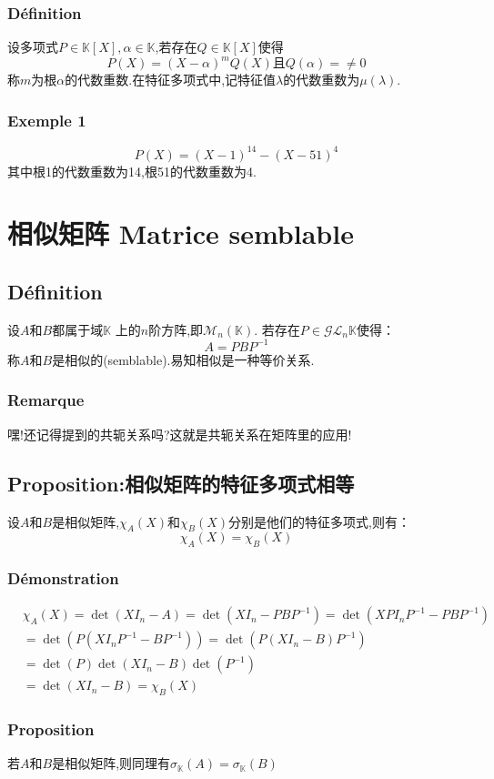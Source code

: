 \documentclass[12pt, a4paper, oneside]{ctexbook}
\newcommand{\n }{$n$}\newcommand{\f  }{$ f $}
\begin{document}
  \subsubsection{Définition}
  设多项式$P\in\mathbb {K} [X], \alpha\in\mathbb {K}$,若存在$Q\in\mathbb {K} [X]$使得
  $$
    P(X)=(X-\alpha)^mQ(X)\mbox{且}Q(\alpha)=\neq 0
  $$
  称$m$为根$\alpha$的代数重数.在特征多项式中,记特征值$\lambda$的代数重数为$\mu(\lambda)$.
  \subsubsection{Exemple 1}
  $$
  P(X)=(X-1)^{14}-(X-51)^4
  $$
  其中根1的代数重数为14,根51的代数重数为4.
\section{相似矩阵 Matrice semblable}
  \subsection{Définition}
  设$A$和$B$都属于域$\mathbb {K}$ 上的\n 阶方阵,即$\mathcal{M}_n(\mathbb{K})$.
  若存在$P\in\mathcal{G} \mathcal{L} _n\mathbb{K}$使得：
  $$
    A=PBP^{-1}
  $$
  称$A$和$B$是相似的(semblable).易知相似是一种等价关系.
  \subsubsection{Remarque}
  嘿!还记得提到的共轭关系吗?这就是共轭关系在矩阵里的应用!
  \subsection{Proposition:相似矩阵的特征多项式相等}
  设$A$和$B$是相似矩阵,$\chi_A(X)$和$\chi_B(X)$分别是他们的特征多项式,则有：
  $$
  \chi_A(X)=\chi_B(X)
  $$
  \subsubsection{Démonstration}
  $$
  \begin{aligned}
  &  \chi _A(X)=\det(XI_n-A)=\det(XI_n-PBP^{-1})=\det(XPI_nP^{-1}-PBP^{-1})\\
  &  =\det(P(XI_nP^{-1}-BP^{-1}))=\det(P(XI_n-B)P^{-1})\\
  &  =\det(P)\det(XI_n-B)\det(P^{-1})\\
  &  =\det(XI_n-B)=\chi _B(X)
    \end{aligned}
  $$
  \subsubsection{Proposition}
  若$A$和$B$是相似矩阵,则同理有$\sigma_{\mathbb{K}}(A)=\sigma_{\mathbb{K}}(B)$
\end{document}
